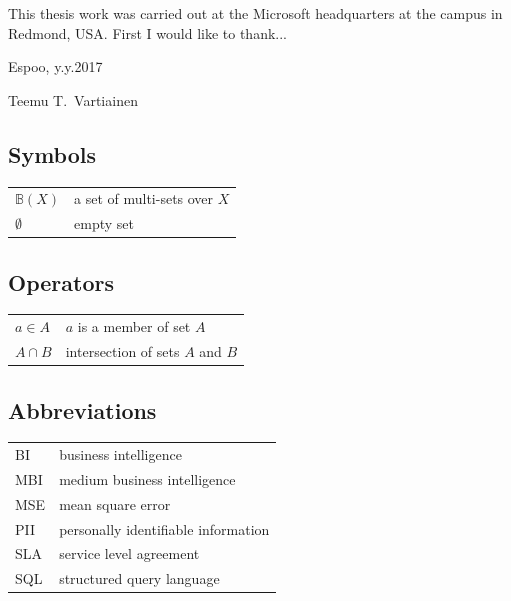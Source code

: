 \documentclass[english,12pt,a4paper,pdftex,sci,utf8]{aaltothesis}
\theoremstyle{definition}
\begin{document}

This thesis work was carried out at the Microsoft headquarters at the campus in Redmond, USA.
First I would like to thank...


\vspace{5cm}
Espoo, y.y.2017

\vspace{5mm}
{\hfill Teemu T.\ Vartiainen \hspace{1cm}}

\newpage


\thesistableofcontents



\subsection*{Symbols}

\begin{tabular}{ll}
$\mathbb{B}(X)$  & a set of multi-sets over $X$ \\
$\emptyset$      & empty set \\
\end{tabular}

\subsection*{Operators}

\begin{tabular}{ll}
$a \in A$    & $a$ is a member of set $A$ \\
$A \cap B$   & intersection of sets $A$ and $B$ \\
\end{tabular}

\subsection*{Abbreviations}

\begin{tabular}{ll}
BI          & business intelligence \\
MBI         & medium business intelligence \\
MSE         & mean square error \\
PII         & personally identifiable information \\
SLA         & service level agreement \\
SQL         & structured query language \\
\end{tabular}
\end{document}
